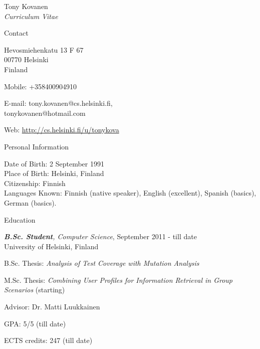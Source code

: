 \documentclass[10pt]{article}
\newenvironment{sublist}{%
	\begin{list}{}{%
		\setlength{\itemsep}{0em}\setlength{\parsep}{0em}%
		\setlength{\topsep}{0em}\setlength{\parskip}{0em}%
	}%
}%
{ \end{list} }
\begin{document}
\begin{cv}{Tony Kovanen\\{\large \itshape Curriculum Vitae}}

\begin{cvlist}{Contact}
	\item
	Hevosmiehenkatu 13 F 67\\
	00770 Helsinki\\
	Finland
	\item Mobile: +358400904910
	\item E-mail: tony.kovanen@cs.helsinki.fi,\\
	\hspace{10mm}tonykovanen@hotmail.com
	\item  Web: \url{http://cs.helsinki.fi/u/tonykova}
\end{cvlist}


\begin{cvlist}{Personal Information}
	\item Date of Birth: 2 September 1991\\
		Place of Birth: Helsinki, Finland\\
		Citizenship: Finnish\\
        Languages Known: Finnish (native speaker), English (excellent), Spanish (basics), German (basics).
\end{cvlist}

\begin{cvlist}{Education}
	\item \emph{{\bf B.Sc. Student}, Computer Science}, September 2011 - till date\\
	University of Helsinki, Finland
	\begin{sublist}
		\item B.Sc. Thesis: \textit{Analysis of Test Coverage with Mutation Analysis}
        \item M.Sc. Thesis: \textit{Combining User Profiles for Information Retrieval in Group Scenarios} (starting)
		\item Advisor: Dr. Matti Luukkainen
        \item GPA: 5/5 (till date)
        \item ECTS credits: 247 (till date)
	\end{sublist}
\end{cvlist}


\end{cv}
\end{document}
